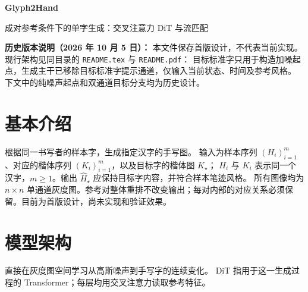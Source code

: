 \documentclass[UTF8,fontset=fandol,zihao=5,a4paper]{ctexart}
\begin{document}
\begin{center}
  {\LARGE\bfseries Glyph2Hand}\par
  \vspace{2pt}
  {\normalsize 成对参考条件下的单字生成：交叉注意力 DiT 与流匹配}
\end{center}

\noindent\textbf{历史版本说明（2026 年 10 月 5 日）：}
本文件保存首版设计，不代表当前实现。现行架构见同目录的 \texttt{README.tex} 与 \texttt{README.pdf}：
目标标准字只用于构造加噪起点，生成主干已移除目标标准字提示通道，仅输入当前状态、时间及参考风格。
下文中的纯噪声起点和双通道目标分支均为历史设计。

\section{基本介绍}
根据同一书写者的样本字，生成指定汉字的手写图。
输入为样本序列 $(H_i)_{i=1}^m$、对应的楷体序列 $(K_i)_{i=1}^m$，以及目标字的楷体图 $K_\star$；
$H_i$ 与 $K_i$ 表示同一个汉字，$m\geq1$。输出 $\widehat H_\star$ 应保持目标字内容，并符合样本笔迹风格。
所有图像均为 $n\times n$ 单通道灰度图。参考对整体重排不改变输出；每对内部的对应关系必须保留。目前为首版设计，尚未实现和验证效果。

\section{模型架构}
直接在灰度图空间学习从高斯噪声到手写字的连续变化。
DiT 指用于这一生成过程的 Transformer；每层均用交叉注意力读取参考特征。
\end{document}
